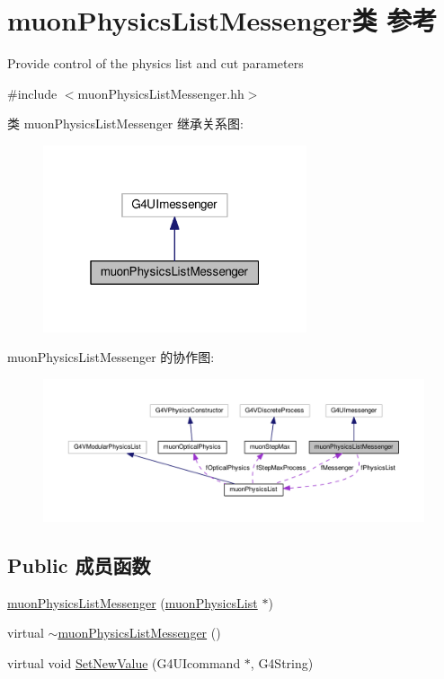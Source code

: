 \hypertarget{classmuonPhysicsListMessenger}{}\section{muon\+Physics\+List\+Messenger类 参考}
\label{classmuonPhysicsListMessenger}


Provide control of the physics list and cut parameters  




{\ttfamily \#include $<$muon\+Physics\+List\+Messenger.\+hh$>$}



类 muon\+Physics\+List\+Messenger 继承关系图\+:\nopagebreak
\begin{figure}[H]
\begin{center}
\leavevmode
\includegraphics[width=220pt]{classmuonPhysicsListMessenger__inherit__graph}
\end{center}
\end{figure}


muon\+Physics\+List\+Messenger 的协作图\+:\nopagebreak
\begin{figure}[H]
\begin{center}
\leavevmode
\includegraphics[width=350pt]{classmuonPhysicsListMessenger__coll__graph}
\end{center}
\end{figure}
\subsection*{Public 成员函数}
\begin{DoxyCompactItemize}
\item 
\hyperlink{classmuonPhysicsListMessenger_a11858a3a5031e4e9b36a2f92906d992f}{muon\+Physics\+List\+Messenger} (\hyperlink{classmuonPhysicsList}{muon\+Physics\+List} $\ast$)
\item 
virtual \hyperlink{classmuonPhysicsListMessenger_a59d68d556679065528c8354027a2eedf}{$\sim$muon\+Physics\+List\+Messenger} ()
\item 
virtual void \hyperlink{classmuonPhysicsListMessenger_a89644cda40ed2e4fa88f2344a7bbedc4}{Set\+New\+Value} (G4\+U\+Icommand $\ast$, G4\+String)
\end{DoxyCompactItemize}
